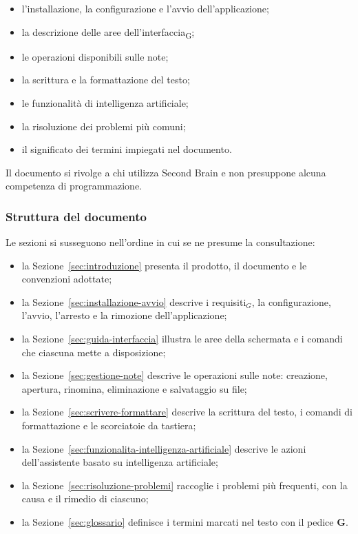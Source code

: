 \documentclass[a4paper, 10pt]{article}
\begin{document}
\begin{itemize}
    \item l'installazione, la configurazione e l'avvio dell'applicazione;

    \item la descrizione delle aree dell'interfaccia\textsubscript{G};

    \item le operazioni disponibili sulle note;

    \item la scrittura e la formattazione del testo;

    \item le funzionalità di intelligenza artificiale;

    \item la risoluzione dei problemi più comuni;

    \item il significato dei termini impiegati nel documento.
\end{itemize}

Il documento si rivolge a chi utilizza Second Brain e non presuppone alcuna competenza di programmazione.

\subsubsection{Struttura del documento}
\label{sec:struttura-documento}
Le sezioni si susseguono nell'ordine in cui se ne presume la consultazione:

\begin{itemize}
    \item la Sezione~\ref{sec:introduzione} presenta il prodotto, il documento e le convenzioni adottate;

    \item la Sezione~\ref{sec:installazione-avvio} descrive i requisiti$_G$, la configurazione, l'avvio, l'arresto e la rimozione dell'applicazione;

    \item la Sezione~\ref{sec:guida-interfaccia} illustra le aree della schermata e i comandi che ciascuna mette a disposizione;

    \item la Sezione~\ref{sec:gestione-note} descrive le operazioni sulle note: creazione, apertura, rinomina, eliminazione e salvataggio su file;

    \item la Sezione~\ref{sec:scrivere-formattare} descrive la scrittura del testo, i comandi di formattazione e le scorciatoie da tastiera;

    \item la Sezione~\ref{sec:funzionalita-intelligenza-artificiale} descrive le azioni dell'assistente basato su intelligenza artificiale;

    \item la Sezione~\ref{sec:risoluzione-problemi} raccoglie i problemi più frequenti, con la causa e il rimedio di ciascuno;

    \item la Sezione~\ref{sec:glossario} definisce i termini marcati nel testo con il pedice \textbf{G}.
\end{itemize}
\end{document}
